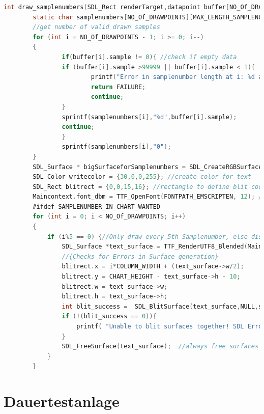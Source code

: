 \begin{lstlisting}[caption={Codeausschnitt - Rendern von Text},captionpos=b,language=C,breaklines]
int draw_samplenumbers(SDL_Rect renderTarget,datapoint buffer[NO_Of_DRAWPOINTS] ,SDL_Surface *surface_of_Viewport){
        static char samplenumbers[NO_Of_DRAWPOINTS][MAX_LENGTH_SAMPLENUMBER];
        //get number of valid drawn samples
        for (int i = NO_Of_DRAWPOINTS - 1; i >= 0; i--)
        {
                if(buffer[i].sample != 0){ //check if empty data
                if (buffer[i].sample >99999 || buffer[i].sample < 1){
                        printf("Error in samplenumber length at i: %d and with: %d" , i, buffer[i].sample);
                        return FAILURE;
                        continue;
                }
                sprintf(samplenumbers[i],"%d",buffer[i].sample);
                continue;
                }
                sprintf(samplenumbers[i],"0");
        }
        SDL_Surface * bigSurfaceforSamplenumbers = SDL_CreateRGBSurfaceWithFormat(0,renderTarget.w,renderTarget.h,32,SDL_PIXELFORMAT_RGBA32);;
        SDL_Color writecolor = {30,0,0,255}; //create color for text
        SDL_Rect blitrect = {0,0,15,16}; //rectangle to define blit coordinates
        Maincontext.font_dbm = TTF_OpenFont(FONTPATH_EMSCRIPTEN, 12); //open font to render text
        #ifdef SAMPLENUMBER_IN_CHART_WANTED
        for (int i = 0; i < NO_Of_DRAWPOINTS; i++)
        {
            if (i%5 == 0) {//Only draw every 5th Samplenumber, else display is crowded
                SDL_Surface *text_surface = TTF_RenderUTF8_Blended(Maincontext.font_dbm,samplenumbers[i], writecolor); //this creates small surface with text 
                //{Checks for Errors in Surface generation}
                blitrect.x = i*COLUMN_WIDTH + (text_surface->w/2);
                blitrect.y = CHART_HEIGHT - text_surface->h - 10;
                blitrect.w = text_surface->w;
                blitrect.h = text_surface->h;
                int blit_success =  SDL_BlitSurface(text_surface,NULL,surface_of_Viewport, &blitrect);
                if (!(blit_success == 0)){
                    printf( "Unable to blit surfaces together! SDL Error on i: %d: %s \n",i, SDL_GetError() );
                }
                SDL_FreeSurface(text_surface);  //always free surfaces after usage --> memory leak
            }
        }        
\end{lstlisting}


\section{Dauertestanlage}
